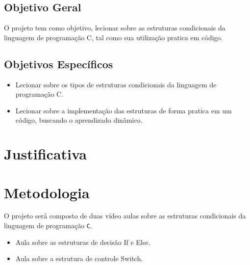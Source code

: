 \documentclass[a4paper,12pt]{article}  %
\begin{document}
 \subsection{Objetivo Geral}

  O projeto tem como objetivo, lecionar sobre as estruturas condicionais da linguagem de programação C, tal como sua utilização pratica em código. 

 \subsection{Objetivos Específicos}

\begin{itemize}
 \item Lecionar sobre os tipos de estruturas condicionais da linguagem de programação C.
 \item Lecionar sobre a implementação das estruturas de forma pratica em um código, buscando o aprendizado dinâmico.  
\end{itemize}


\section{Justificativa}

 



\section{Metodologia}

    O projeto será composto de duas vídeo aulas sobre as estruturas condicionais da linguagem de programação \texttt{C}.

\begin{itemize}

 \item Aula sobre as estruturas de decisão If e Else.
 \item Aula sobre a estrutura de controle Switch.

\end{itemize}
\end{document}
